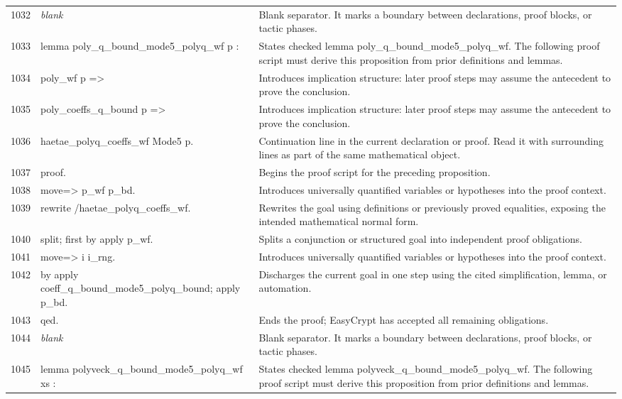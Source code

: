 \documentclass[10pt]{article}
\begin{document}
\begin{longtable}{r L{0.53\textwidth} L{0.37\textwidth}}
1032 & {\ttfamily\scriptsize \emph{blank}} & Blank separator.  It marks a boundary between declarations, proof blocks, or tactic phases. \\
1033 & {\ttfamily\scriptsize lemma poly\_q\_bound\_mode5\_polyq\_wf p :} & States checked lemma poly\_q\_bound\_mode5\_polyq\_wf.  The following proof script must derive this proposition from prior definitions and lemmas. \\
1034 & {\ttfamily\scriptsize   poly\_wf p =>} & Introduces implication structure: later proof steps may assume the antecedent to prove the conclusion. \\
1035 & {\ttfamily\scriptsize   poly\_coeffs\_q\_bound p =>} & Introduces implication structure: later proof steps may assume the antecedent to prove the conclusion. \\
1036 & {\ttfamily\scriptsize   haetae\_polyq\_coeffs\_wf Mode5 p.} & Continuation line in the current declaration or proof.  Read it with surrounding lines as part of the same mathematical object. \\
1037 & {\ttfamily\scriptsize proof.} & Begins the proof script for the preceding proposition. \\
1038 & {\ttfamily\scriptsize move=> p\_wf p\_bd.} & Introduces universally quantified variables or hypotheses into the proof context. \\
1039 & {\ttfamily\scriptsize rewrite /haetae\_polyq\_coeffs\_wf.} & Rewrites the goal using definitions or previously proved equalities, exposing the intended mathematical normal form. \\
1040 & {\ttfamily\scriptsize split; first by apply p\_wf.} & Splits a conjunction or structured goal into independent proof obligations. \\
1041 & {\ttfamily\scriptsize move=> i i\_rng.} & Introduces universally quantified variables or hypotheses into the proof context. \\
1042 & {\ttfamily\scriptsize by apply coeff\_q\_bound\_mode5\_polyq\_bound; apply p\_bd.} & Discharges the current goal in one step using the cited simplification, lemma, or automation. \\
1043 & {\ttfamily\scriptsize qed.} & Ends the proof; EasyCrypt has accepted all remaining obligations. \\
1044 & {\ttfamily\scriptsize \emph{blank}} & Blank separator.  It marks a boundary between declarations, proof blocks, or tactic phases. \\
1045 & {\ttfamily\scriptsize lemma polyveck\_q\_bound\_mode5\_polyq\_wf xs :} & States checked lemma polyveck\_q\_bound\_mode5\_polyq\_wf.  The following proof script must derive this proposition from prior definitions and lemmas. \\

\end{longtable}
\end{document}

